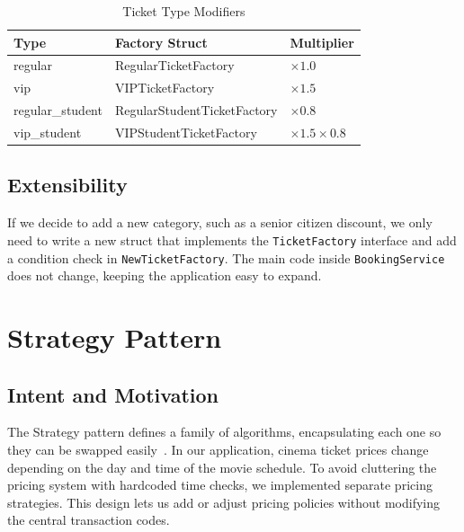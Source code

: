 \documentclass[conference]{IEEEtran}
\begin{document}
\begin{table}[htbp]
\caption{Ticket Type Modifiers}
\label{tab:ticket_types}
\begin{center}
\begin{tabular}{p{1.6cm}p{2.8cm}p{2.2cm}}
\toprule
\textbf{Type} & \textbf{Factory Struct} & \textbf{Multiplier} \\
\midrule
regular          & RegularTicketFactory        & $\times 1.0$ \\
vip              & VIPTicketFactory            & $\times 1.5$ \\
regular\_student & RegularStudentTicketFactory & $\times 0.8$ \\
vip\_student     & VIPStudentTicketFactory     & $\times 1.5 \times 0.8$ \\
\bottomrule
\end{tabular}
\end{center}
\end{table}

\subsection{Extensibility}

If we decide to add a new category, such as a senior citizen discount, we only need to write a new struct that implements the \texttt{TicketFactory} interface and add a condition check in \texttt{NewTicketFactory}. The main code inside \texttt{BookingService} does not change, keeping the application easy to expand.

\section{Strategy Pattern}
\label{sec:strategy}

\subsection{Intent and Motivation}

The Strategy pattern defines a family of algorithms, encapsulating each one so they can be swapped easily~\cite{gamma1994design}. In our application, cinema ticket prices change depending on the day and time of the movie schedule. To avoid cluttering the pricing system with hardcoded time checks, we implemented separate pricing strategies. This design lets us add or adjust pricing policies without modifying the central transaction codes.
\end{document}
